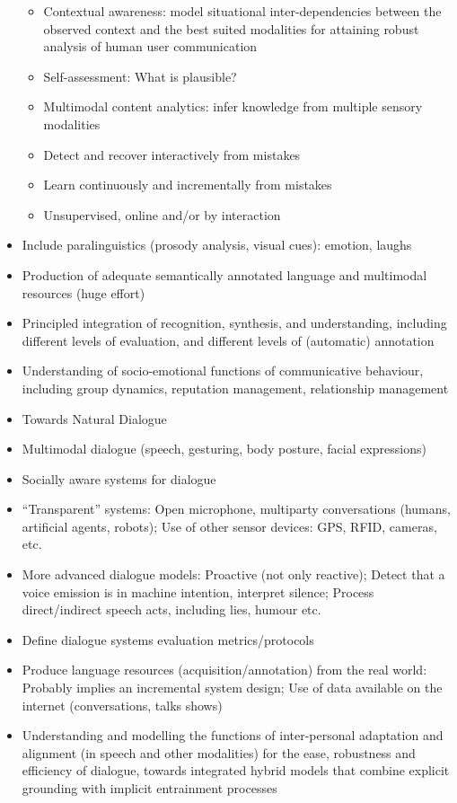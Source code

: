 \documentclass[10pt, plain]{../../metanetpaper}
\begin{document}
\begin{multicols}{2}
\begin{itemize}
\begin{itemize}
  \item Contextual awareness: model situational inter-dependencies between the observed context and the best suited modalities for attaining robust analysis of human user communication
  \item Self-assessment: What is plausible?
  \item Multimodal content analytics: infer knowledge from multiple sensory modalities
  \item	Detect and recover interactively from mistakes
  \item Learn continuously and incrementally from mistakes
  \item Unsupervised, online and/or by interaction
  \end{itemize}
\item Include paralinguistics (prosody analysis, visual cues): emotion, laughs
\item Production of adequate semantically annotated language and multimodal resources (huge effort)
\item Principled integration of recognition, synthesis, and understanding, including different levels of evaluation, and different levels of (automatic) annotation
\item Understanding of socio-emotional functions of communicative behaviour, including group dynamics, reputation management, relationship management
\item Towards Natural Dialogue
\item Multimodal dialogue (speech, gesturing, body posture, facial expressions)
\item Socially aware systems for dialogue
\item “Transparent” systems: Open microphone, multiparty conversations (humans, artificial agents, robots); Use of other sensor devices: GPS, RFID, cameras, etc.
\item More advanced dialogue models: Proactive (not only reactive); Detect that a voice emission is in machine intention, interpret silence; Process direct/indirect speech acts, including lies, humour etc.
\item Define dialogue systems evaluation metrics/protocols
\item Produce language resources (acquisition/annotation) from the real world: Probably implies an incremental system design; Use of data available on the internet (conversations, talks shows)
\item Understanding and modelling the functions of inter-personal adaptation and alignment (in speech and other modalities) for the ease, robustness and efficiency of dialogue, towards integrated hybrid models that combine explicit grounding with implicit entrainment processes

\end{itemize}
\end{multicols}
\end{document}
